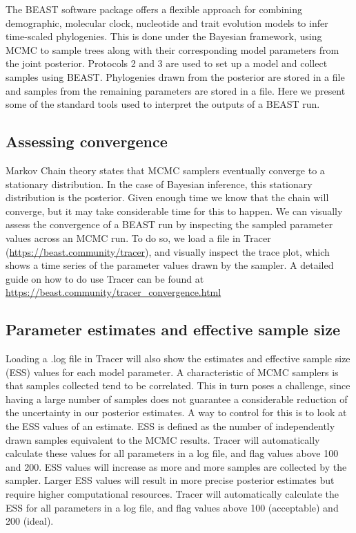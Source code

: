 \documentclass{article}
\newcommand{\code}[1]{
{\upshape\ttfamily{#1}}}
\begin{document}
The BEAST software package offers a flexible approach for combining demographic, molecular clock, nucleotide and trait evolution models to infer time-scaled phylogenies. This is done under the Bayesian framework, using MCMC to sample trees along with their corresponding model parameters from the joint posterior. Protocols 2 and 3 are used to set up a model and collect samples using BEAST. Phylogenies drawn from the posterior are stored in a \code{.trees} file and samples from the remaining parameters are stored in a \code{.log} file. Here we present some of the standard tools used to interpret the outputs of a BEAST run.

\subsection*{Assessing convergence}

Markov Chain theory states that MCMC samplers eventually converge to a stationary distribution. In the case of Bayesian inference, this stationary distribution is the posterior. Given enough time we know that the chain will converge, but it may take considerable time for this to happen. We can visually assess the convergence of a BEAST run by inspecting the sampled parameter values across an MCMC run. To do so, we load a \code{.log} file in Tracer (\url{https://beast.community/tracer}), and visually inspect the trace plot, which shows a time series of the parameter values drawn by the sampler. A detailed guide on how to do use Tracer can be found at \url{https://beast.community/tracer_convergence.html}

\subsection*{Parameter estimates and effective sample size}

Loading a .log file in Tracer will also show the estimates and effective sample size (ESS) values for each model parameter. A characteristic of MCMC samplers is that samples collected tend to be correlated. This in turn poses a challenge, since having a large number of samples does not guarantee a considerable reduction of the uncertainty in our posterior estimates. A way to control for this is to look at the ESS values of an estimate. ESS is defined as the number of independently drawn samples equivalent to the MCMC results. Tracer will automatically calculate these values for all parameters in a log file, and flag values above 100 and 200. ESS values will increase as more and more samples are collected by the sampler. Larger ESS values will result in more precise posterior estimates but require higher computational resources. Tracer will automatically calculate the ESS for all parameters in a log file, and flag values above 100 (acceptable) and 200 (ideal).
\end{document}
